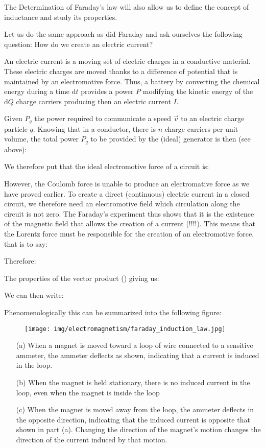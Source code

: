 	The Determination of Faraday's law will also allow us to define the concept of inductance and study its properties.

	Let us do the same approach as did Faraday and ask ourselves the following question: How do we create an electric current?

	An electric current is a moving set of electric charges in a conductive material. These electric charges are moved thanks to a difference of potential that is maintained by an electromotive force. Thus, a battery by converting the chemical energy during a time $\mathrm{d}t$ provides a power $P$ modifying the kinetic energy of the $\mathrm{d}Q$ charge carriers producing then an electric current $I$.

	Given $P_q$ the power required to communicate a speed $\vec{v}$ to an electric charge particle $q$. Knowing that in a conductor, there is $n$ charge carriers per unit volume, the total power $P_q$ to be provided by the (ideal) generator is then (see above):
	
	We therefore put that the ideal electromotive force of a circuit is:
	
	However, the Coulomb force is unable to produce an electromative force as we have proved earlier. To create a direct (continuous) electric current in a closed circuit, we therefore need an electromotive field which circulation along the circuit is not zero. The Faraday's experiment thus shows that it is the existence of the magnetic field that allows the creation of a current (!!!!). This means that the Lorentz force must be responsible for the creation of an electromotive force, that is to say:
	
	Therefore:
	
	The properties of the vector product () giving us:
	
	We can then write:
	
	Phenomenologically this can be summarized into the following figure:
	\begin{figure}[H]
		\centering
		\texttt{[image: img/electromagnetism/faraday\_induction\_law.jpg]}
	\end{figure}
	\begin{enumerate}
		\item[(a)] When a magnet is moved toward a loop of wire connected to a sensitive ammeter, the ammeter deflects as shown, indicating that a current is induced in the loop. 
		
		\item[(b)] When the magnet is held stationary, there is no induced current in the loop, even when the magnet is inside the loop
		
		\item[(c)] When the magnet is moved away from the loop, the ammeter deflects in the opposite direction, indicating that the induced current is opposite that shown in part (a). Changing the direction of the magnet's motion changes the direction of the current induced by that motion.
	\end{enumerate}
	
